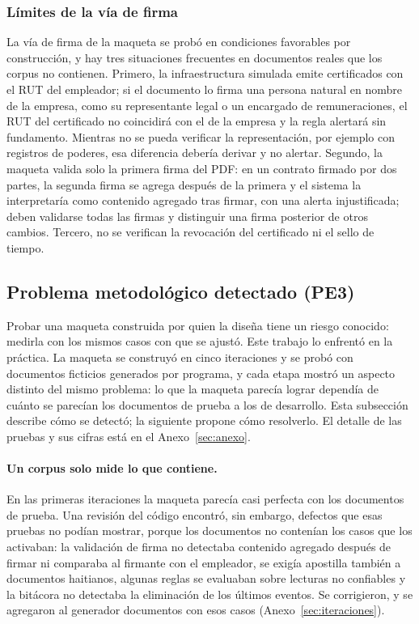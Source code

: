 \documentclass[11pt,a4paper]{article}
\begin{document}
\subsubsection{Límites de la vía de firma}
\label{sec:limfirma}
La vía de firma de la maqueta se probó en condiciones favorables por construcción, y hay tres situaciones frecuentes en documentos reales que los corpus no contienen. Primero, la infraestructura simulada emite certificados con el RUT del empleador; si el documento lo firma una persona natural en nombre de la empresa, como su representante legal o un encargado de remuneraciones, el RUT del certificado no coincidirá con el de la empresa y la regla alertará sin fundamento. Mientras no se pueda verificar la representación, por ejemplo con registros de poderes, esa diferencia debería derivar y no alertar. Segundo, la maqueta valida solo la primera firma del PDF: en un contrato firmado por dos partes, la segunda firma se agrega después de la primera y el sistema la interpretaría como contenido agregado tras firmar, con una alerta injustificada; deben validarse todas las firmas y distinguir una firma posterior de otros cambios. Tercero, no se verifican la revocación del certificado ni el sello de tiempo.

\subsection{Problema metodológico detectado (PE3)}
\label{sec:metodologico}

Probar una maqueta construida por quien la diseña tiene un riesgo conocido: medirla con los mismos casos con que se ajustó. Este trabajo lo enfrentó en la práctica. La maqueta se construyó en cinco iteraciones y se probó con documentos ficticios generados por programa, y cada etapa mostró un aspecto distinto del mismo problema: lo que la maqueta parecía lograr dependía de cuánto se parecían los documentos de prueba a los de desarrollo. Esta subsección describe cómo se detectó; la siguiente propone cómo resolverlo. El detalle de las pruebas y sus cifras está en el Anexo~\ref{sec:anexo}.

\paragraph{Un corpus solo mide lo que contiene.} En las primeras iteraciones la maqueta parecía casi perfecta con los documentos de prueba. Una revisión del código encontró, sin embargo, defectos que esas pruebas no podían mostrar, porque los documentos no contenían los casos que los activaban: la validación de firma no detectaba contenido agregado después de firmar ni comparaba al firmante con el empleador, se exigía apostilla también a documentos haitianos, algunas reglas se evaluaban sobre lecturas no confiables y la bitácora no detectaba la eliminación de los últimos eventos. Se corrigieron, y se agregaron al generador documentos con esos casos (Anexo~\ref{sec:iteraciones}).
\end{document}
